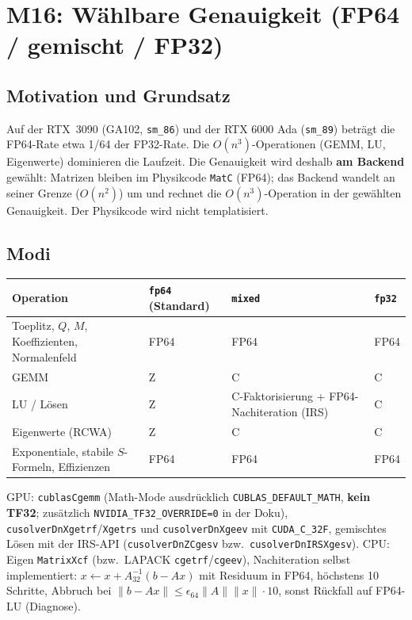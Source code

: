 \section{M16: Wählbare Genauigkeit (FP64 / gemischt / FP32)}\label{sec:precision}

\subsection{Motivation und Grundsatz}
Auf der RTX~3090 (GA102, \verb|sm_86|) und der RTX 6000 Ada (\verb|sm_89|) beträgt die FP64-Rate etwa 1/64 der
FP32-Rate. Die $O(n^3)$-Operationen (GEMM, LU, Eigenwerte) dominieren die Laufzeit. Die Genauigkeit wird deshalb
\textbf{am Backend} gewählt: Matrizen bleiben im Physikcode \verb|MatC| (FP64); das Backend wandelt an seiner Grenze
($O(n^2)$) um und rechnet die $O(n^3)$-Operation in der gewählten Genauigkeit. Der Physikcode wird nicht templatisiert.

\subsection{Modi}
\begin{center}
\small
\begin{tabular}{p{4.6cm}p{2.6cm}p{3.6cm}p{3.0cm}}
\toprule
Operation & \verb|fp64| (Standard) & \verb|mixed| & \verb|fp32| \\
\midrule
Toeplitz, $Q$, $M$, Koeffizienten, Normalenfeld & FP64 & FP64 & FP64 \\
GEMM & Z & C & C \\
LU / Lösen & Z & C-Faktorisierung + FP64-Nachiteration (IRS) & C \\
Eigenwerte (RCWA) & Z & C & C \\
Exponentiale, stabile $S$-Formeln, Effizienzen & FP64 & FP64 & FP64 \\
\bottomrule
\end{tabular}
\end{center}
GPU: \verb|cublasCgemm| (Math-Mode ausdrücklich \verb|CUBLAS_DEFAULT_MATH|, \textbf{kein TF32}; zusätzlich
\verb|NVIDIA_TF32_OVERRIDE=0| in der Doku), \verb|cusolverDnXgetrf|/\verb|Xgetrs| und \verb|cusolverDnXgeev| mit
\verb|CUDA_C_32F|, gemischtes Lösen mit der IRS-API (\verb|cusolverDnZCgesv| bzw.\ \verb|cusolverDnIRSXgesv|).
CPU: Eigen \verb|MatrixXcf| (bzw.\ LAPACK \verb|cgetrf|/\verb|cgeev|), Nachiteration selbst implementiert:
$x\leftarrow x+A^{-1}_{32}(b-Ax)$ mit Residuum in FP64, höchstens 10 Schritte, Abbruch bei
$\|b-Ax\|\le\epsilon_{64}\|A\|\|x\|\cdot10$, sonst Rückfall auf FP64-LU (Diagnose).

